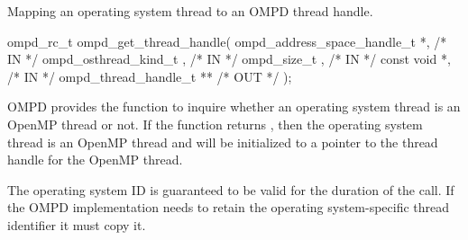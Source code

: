 %
%
%
%
%
%
%


\summary
Mapping an operating system thread to an OMPD thread handle.
\format
\ccppspecificstart
\begin{boxedcode}
ompd\_rc\_t ompd\_get\_thread\_handle(
  ompd\_address\_space\_handle\_t   *,                            /* IN */
  ompd\_osthread\_kind\_t           ,                              /* IN */
  ompd\_size\_t                    ,                   /* IN */
  const void                    *,                          /* IN */
  ompd\_thread\_handle\_t         **                     /* OUT */
);
\end{boxedcode}
\ccppspecificend

\descr
OMPD provides the function 
to inquire whether an operating system thread is an OpenMP
thread or not.
If the function returns , then the operating
system thread is an OpenMP thread and 
will be initialized to a pointer to the thread handle for
the OpenMP thread.

\argdesc

The operating system ID  is guaranteed
to be valid for the duration of the call.
If the OMPD implementation needs to retain the operating system-specific
thread identifier it must copy it.

